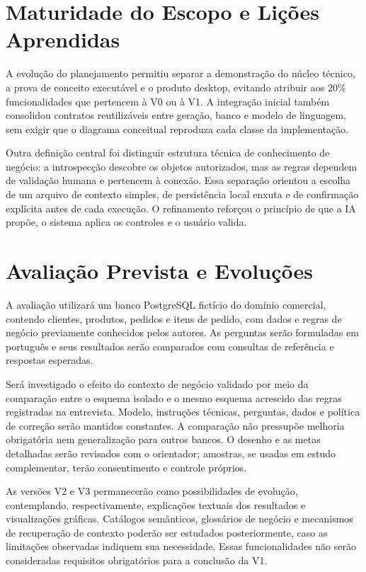 \section{Maturidade do Escopo e Lições Aprendidas}

A evolução do planejamento permitiu separar a demonstração do núcleo técnico, a prova de conceito executável e o produto desktop, evitando atribuir aos 20\% funcionalidades que pertencem à V0 ou à V1. A integração inicial também consolidou contratos reutilizáveis entre geração, banco e modelo de linguagem, sem exigir que o diagrama conceitual reproduza cada classe da implementação.

Outra definição central foi distinguir estrutura técnica de conhecimento de negócio: a introspecção descobre os objetos autorizados, mas as regras dependem de validação humana e pertencem à conexão. Essa separação orientou a escolha de um arquivo de contexto simples, de persistência local enxuta e de confirmação explícita antes de cada execução. O refinamento reforçou o princípio de que a IA propõe, o sistema aplica os controles e o usuário valida.

\section{Avaliação Prevista e Evoluções}

A avaliação utilizará um banco PostgreSQL fictício do domínio comercial, contendo clientes, produtos, pedidos e itens de pedido, com dados e regras de negócio previamente conhecidos pelos autores. As perguntas serão formuladas em português e seus resultados serão comparados com consultas de referência e respostas esperadas.

Será investigado o efeito do contexto de negócio validado por meio da comparação entre o esquema isolado e o mesmo esquema acrescido das regras registradas na entrevista. Modelo, instruções técnicas, perguntas, dados e política de correção serão mantidos constantes. A comparação não pressupõe melhoria obrigatória nem generalização para outros bancos. O desenho e as metas detalhadas serão revisados com o orientador; amostras, se usadas em estudo complementar, terão consentimento e controle próprios.

As versões V2 e V3 permanecerão como possibilidades de evolução, contemplando, respectivamente, explicações textuais dos resultados e visualizações gráficas. Catálogos semânticos, glossários de negócio e mecanismos de recuperação de contexto poderão ser estudados posteriormente, caso as limitações observadas indiquem sua necessidade. Essas funcionalidades não serão consideradas requisitos obrigatórios para a conclusão da V1.
